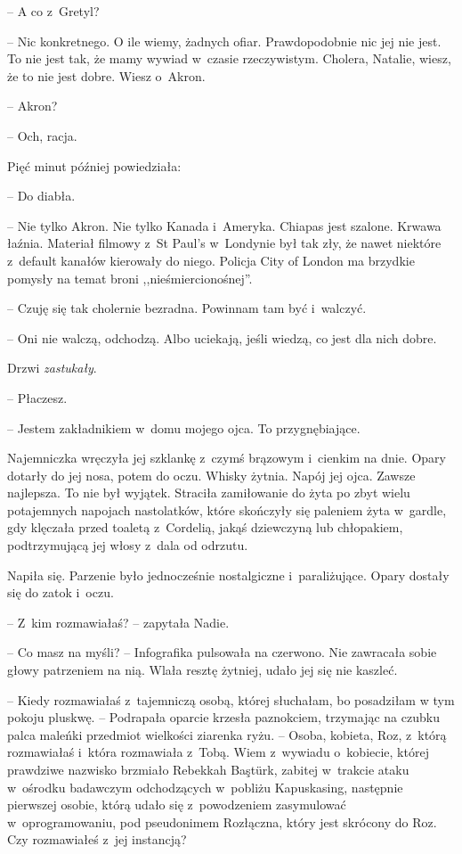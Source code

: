\documentclass[oneside,polish,11pt,sfheadings]{mwbk}
\begin{document}
-- A co z~Gretyl?

-- Nic konkretnego. O ile wiemy, żadnych ofiar. Prawdopodobnie nic jej
nie jest. To nie jest tak, że mamy wywiad w~czasie rzeczywistym.
Cholera, Natalie, wiesz, że to nie jest dobre. Wiesz o~Akron.

-- Akron?

-- Och, racja.

Pięć minut później powiedziała: 

-- Do diabła.

-- Nie tylko Akron. Nie tylko Kanada i~Ameryka. Chiapas jest szalone.
Krwawa łaźnia. Materiał filmowy z~St Paul's w~Londynie był tak zły, że
nawet niektóre z~default kanałów kierowały do niego. Policja City of
London ma brzydkie pomysły na temat broni ,,nieśmiercionośnej''.

-- Czuję się tak cholernie bezradna. Powinnam tam być i~walczyć.

-- Oni nie walczą, odchodzą. Albo uciekają, jeśli wiedzą, co jest dla
nich dobre.

Drzwi \textit{zastukały}.

-- Płaczesz.

-- Jestem zakładnikiem w~domu mojego ojca. To przygnębiające.

Najemniczka wręczyła jej szklankę z~czymś brązowym i~cienkim na dnie.
Opary dotarły do jej nosa, potem do oczu. Whisky żytnia. Napój jej ojca.
Zawsze najlepsza. To nie był wyjątek. Straciła zamiłowanie do żyta po
zbyt wielu potajemnych napojach nastolatków, które skończyły się
paleniem żyta w~gardle, gdy klęczała przed toaletą z~Cordelią, jakąś
dziewczyną lub chłopakiem, podtrzymującą jej włosy z~dala od odrzutu.

Napiła się. Parzenie było jednocześnie nostalgiczne i~paraliżujące.
Opary dostały się do zatok i~oczu.

-- Z~kim rozmawiałaś? -- zapytała Nadie.

-- Co masz na myśli? -- Infografika pulsowała na czerwono. Nie zawracała
sobie głowy patrzeniem na nią. Wlała resztę żytniej, udało jej się nie
kaszleć.

-- Kiedy rozmawiałaś z~tajemniczą osobą, której słuchałam, bo posadziłam
w tym pokoju pluskwę. -- Podrapała oparcie krzesła paznokciem, trzymając
na czubku palca maleńki przedmiot wielkości ziarenka ryżu. -- Osoba,
kobieta, Roz, z~którą rozmawiałaś i~która rozmawiała z~Tobą. Wiem z~wywiadu o~kobiecie, której prawdziwe nazwisko brzmiało Rebekkah Baştürk,
zabitej w~trakcie ataku w~ośrodku badawczym odchodzących w~pobliżu
Kapuskasing, następnie pierwszej osobie, którą udało się z~powodzeniem
zasymulować w~oprogramowaniu, pod pseudonimem Rozłączna, który jest
skrócony do Roz. Czy rozmawiałeś z~jej instancją?
\end{document}
